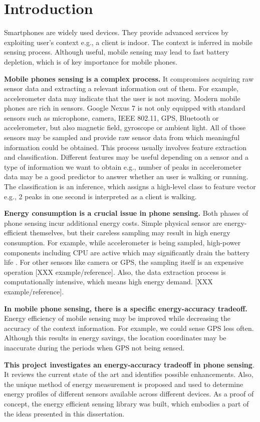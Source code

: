 \section{Introduction}
\label{s:intro}
\hspace{10pt} Smartphones are widely used devices. They provide advanced services by exploiting user's context e.g., a client is indoor. The context is inferred in mobile sensing process. Although useful, mobile sensing may lead to fast battery depletion, which is of key importance for mobile phones. 

\textbf{Mobile phones sensing is a complex process.} It compromises acquiring raw sensor data and extracting a relevant information out of them. For example, accelerometer data may indicate that the user is not moving. Modern mobile phones are rich in sensors. Google Nexus 7 is not only equipped with standard sensors such as microphone, camera, IEEE 802.11, GPS, Bluetooth or accelerometer, but also magnetic field, gyroscope or ambient light. All of those sensors may be sampled and provide raw sensor data from which meaningful information could be obtained. This process usually involves feature extraction and classification. Different features may be useful depending on a sensor and a type of information we want to obtain e.g., number of peaks in accelerometer data may be a good predictor to answer whether an user is walking or running. The classification is an inference, which assigns a high-level class to feature vector e.g., 2 peaks in one second is interpreted as a client is walking.

\textbf{Energy consumption is a crucial issue in phone sensing.} Both phases of phone sensing incur additional energy costs. Simple physical sensor are energy-efficient themselves, but their careless sampling may result in high energy consumption. For example, while accelerometer is being sampled, high-power components including CPU are active which may significantly drain the battery life \cite{priyantha:littlerock}. For other sensors like camera or GPS, the sampling itself is an expensive operation [XXX example/reference]. Also, the data extraction process is computationally intensive, which means high energy demand. [XXX example/reference]. 

\textbf{In mobile phone sensing, there is a specific energy-accuracy tradeoff.} Energy efficiency of mobile sensing may be improved while decreasing the accuracy of the context information. For example, we could sense GPS less often. Although this results in energy savings, the location coordinates may be inaccurate during the periods when GPS not being sensed. 

\textbf{This project investigates an energy-accuracy tradeoff in phone sensing}. It reviews the current state of the art and identifies possible enhancements. Also, the unique method of energy measurement is proposed and used to determine energy profiles of different sensors available across different devices. As a proof of concept, the energy efficient sensing library was built, which embodies a part of the ideas presented in this dissertation.